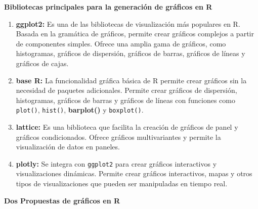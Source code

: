 \documentclass[12pt]{article}
\begin{document}
            \vspace{0.5cm}\textbf{Bibliotecas principales para la generación de gráficos en R} \vspace{0.5cm}
            
            \begin{enumerate}
                \item \textbf{ggplot2:}  Es una de las bibliotecas de visualización más populares en R. Basada en la gramática de gráficos, permite crear gráficos complejos a partir de componentes simples. Ofrece una amplia gama de gráficos, como histogramas, gráficos de dispersión, gráficos de barras, gráficos de líneas y gráficos de cajas.
                \item \textbf{base R:} La funcionalidad gráfica básica de R permite crear gráficos sin la necesidad de paquetes adicionales. Permite crear gráficos de dispersión, histogramas, gráficos de barras y gráficos de líneas con funciones como \texttt{plot()}, \texttt{hist()}, \textbf{barplot()} y \texttt{boxplot()}.
                \item \textbf{lattice:} Es una biblioteca que facilita la creación de gráficos de panel y gráficos condicionados. Ofrece gráficos multivariantes y permite la visualización de datos en paneles.
                \item \textbf{plotly:} Se integra con \texttt{ggplot2} para crear gráficos interactivos y visualizaciones dinámicas. Permite crear gráficos interactivos, mapas y otros tipos de visualizaciones que pueden ser manipuladas en tiempo real.
            \end{enumerate}

            \newpage\textbf{Dos Propuestas de gráficos en R} \vspace{0.5cm}
\end{document}
